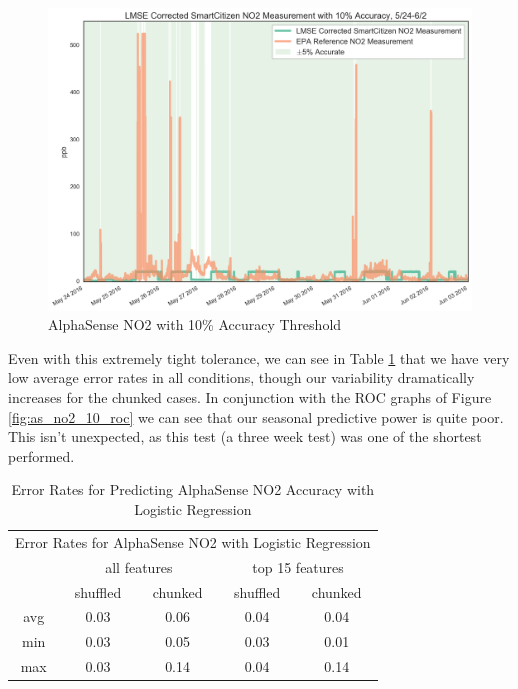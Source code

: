 \begin{figure}[htb]
 	\includegraphics[width=\textwidth]{figs/as_no2_with_10_accuracy_zoomed}               
 	 \caption{AlphaSense NO2 with 10\% Accuracy Threshold}
  	\label{fig:as_no2_with_10_accuracy_zoomed}
\end{figure}


Even with this extremely tight tolerance, we can see in Table \ref{tab:as_no2_error_rates} that we have very low average error rates in all conditions, though our variability dramatically increases for the chunked cases.  In conjunction with the ROC graphs of Figure \ref{fig:as_no2_10_roc} we can see that our seasonal predictive power is quite poor.  This isn't unexpected, as this test (a three week test) was one of the shortest performed.


\begin{table}
\centering
\begin{tabular}{|c|c|c|c|c|}
\toprule
\multicolumn{5}{|c|}{Error Rates for AlphaSense NO2 with Logistic Regression} \\
&\multicolumn{2}{|c|}{all features} & \multicolumn{2}{|c|}{top 15 features} \\
&shuffled & chunked & shuffled & chunked \\
avg & 0.03 & 0.06 & 0.04 & 0.04 \\
min & 0.03 & 0.05 & 0.03 & 0.01 \\
max & 0.03 & 0.14 & 0.04 & 0.14 \\
\bottomrule
\end{tabular}
\label{tab:as_no2_error_rates}
\caption{Error Rates for Predicting AlphaSense NO2 Accuracy with Logistic Regression}
\end{table}



